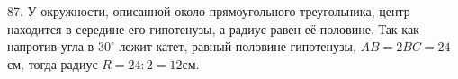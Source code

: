 87. У окружности, описанной около прямоугольного треугольника, центр находится в середине его гипотенузы, а радиус равен её половине. Так как напротив угла в $30^\circ$ лежит катет, равный половине гипотенузы, $AB=2BC=24$см, тогда радиус $R=24:2=12$см.\\
